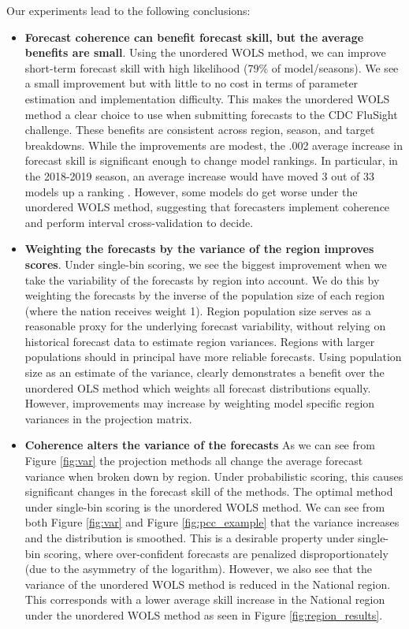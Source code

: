 \documentclass{umassthesis}          %
\begin{document}
   
   Our experiments lead to the following conclusions:
     \begin{itemize}
   \item \textbf{Forecast coherence can benefit forecast skill, but the average benefits are small}. Using the unordered WOLS method, we can improve short-term forecast skill with high likelihood (79\% of model/seasons). We see a small improvement but with little to no cost in terms of parameter estimation and implementation difficulty. This makes the unordered WOLS method a clear choice to use when submitting forecasts to the CDC FluSight challenge. These benefits are consistent across region, season, and target breakdowns. While the improvements are modest, the .002 average increase in forecast skill is significant enough to change model rankings. In particular, in the 2018-2019 season, an average increase would have moved 3 out of 33 models up a ranking \cite{cdcscores}. However, some models do get worse under the unordered WOLS method, suggesting that forecasters implement coherence and perform interval cross-validation to decide.   
      
  \item \textbf{Weighting the forecasts by the variance of the region improves scores}. Under single-bin scoring, we see the biggest improvement when we take the variability of the forecasts by region into account. We do this by weighting the forecasts by the inverse of the population size of each region (where the nation receives weight 1). Region population size serves as a reasonable proxy for the underlying forecast variability, without relying on historical forecast data to estimate region variances. Regions with larger populations should in principal have more reliable forecasts. Using population size as an estimate of the variance, clearly demonstrates a benefit over the unordered OLS method which weights all forecast distributions equally. However, improvements may increase by weighting model specific region variances in the projection matrix. 

    
     
     \item \textbf{Coherence alters the variance of the forecasts} As we can see from Figure \ref{fig:var} the projection methods all change the average forecast variance when broken down by region. Under probabilistic scoring, this causes significant changes in the forecast skill of the methods. The optimal method under single-bin scoring is the unordered WOLS method. We can see from both Figure \ref{fig:var} and Figure \ref{fig:pcc_example} that the variance increases and the distribution is smoothed. This is a desirable property under single-bin scoring, where over-confident forecasts are penalized disproportionately (due to the asymmetry of the logarithm).  However, we also see that the variance of the unordered WOLS method is reduced in the National region. This corresponds with a lower average skill increase in the National region under the unordered WOLS method as seen in Figure \ref{fig:region_results}.
    

\end{itemize}
\end{document}
